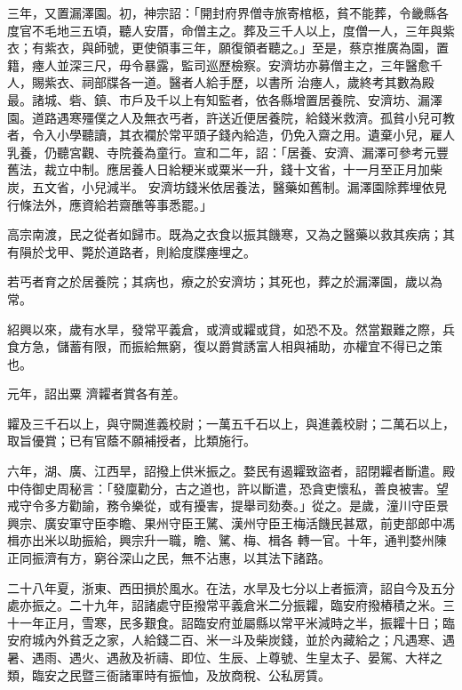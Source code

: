 \begin{pinyinscope}
 三年，又置漏澤園。初，神宗詔：「開封府界僧寺旅寄棺柩，貧不能葬，令畿縣各度官不毛地三五頃，聽人安厝，命僧主之。葬及三千人以上，度僧一人，三年與紫衣；有紫衣，與師號，更使領事三年，願復領者聽之。」至是，蔡京推廣為園，置籍，瘞人並深三尺，毋令暴露，監司巡歷檢察。安濟坊亦募僧主之，三年醫愈千人，賜紫衣、祠部牒各一道。醫者人給手歷，以書所
 治瘞人，歲終考其數為殿最。諸城、砦、鎮、市戶及千以上有知監者，依各縣增置居養院、安濟坊、漏澤園。道路遇寒殭僕之人及無衣丐者，許送近便居養院，給錢米救濟。孤貧小兒可教者，令入小學聽讀，其衣襴於常平頭子錢內給造，仍免入齋之用。遺棄小兒，雇人乳養，仍聽宮觀、寺院養為童行。宣和二年，詔：「居養、安濟、漏澤可參考元豐舊法，裁立中制。應居養人日給粳米或粟米一升，錢十文省，十一月至正月加柴炭，五文省，小兒減半。
 安濟坊錢米依居養法，醫藥如舊制。漏澤園除葬埋依見行條法外，應資給若齋醮等事悉罷。」



 高宗南渡，民之從者如歸市。既為之衣食以振其饑寒，又為之醫藥以救其疾病；其有隕於戈甲、斃於道路者，則給度牒瘞埋之。



 若丐者育之於居養院；其病也，療之於安濟坊；其死也，葬之於漏澤園，歲以為常。



 紹興以來，歲有水旱，發常平義倉，或濟或糶或貸，如恐不及。然當艱難之際，兵食方急，儲蓄有限，而振給無窮，復以爵賞誘富人相與補助，亦權宜不得已之策也。



 元年，詔出粟
 濟糶者賞各有差。



 糶及三千石以上，與守闕進義校尉；一萬五千石以上，與進義校尉；二萬石以上，取旨優賞；已有官蔭不願補授者，比類施行。



 六年，湖、廣、江西旱，詔撥上供米振之。婺民有遏糶致盜者，詔閉糶者斷遣。殿中侍御史周秘言：「發廩勸分，古之道也，許以斷遣，恐貪吏懷私，善良被害。望戒守令多方勸諭，務令樂從，或有擾害，提舉司劾奏。」從之。是歲，潼川守臣景興宗、廣安軍守臣李瞻、果州守臣王騭、漢州守臣王梅活饑民甚眾，前吏部郎中馮楫亦出米以助振給，興宗升一職，瞻、騭、梅、楫各
 轉一官。十年，通判婺州陳正同振濟有方，窮谷深山之民，無不沾惠，以其法下諸路。



 二十八年夏，浙東、西田損於風水。在法，水旱及七分以上者振濟，詔自今及五分處亦振之。二十九年，詔諸處守臣撥常平義倉米二分振糶，臨安府撥樁積之米。三十一年正月，雪寒，民多艱食。詔臨安府並屬縣以常平米減時之半，振糶十日；臨安府城內外貧乏之家，人給錢二百、米一斗及柴炭錢，並於內藏給之；凡遇寒、遇暑、遇雨、遇火、遇赦及祈禱、即位、生辰、上尊號、生皇太子、晏駕、大祥之
 類，臨安之民暨三衙諸軍時有振恤，及放商稅、公私房賃。




\end{pinyinscope}
